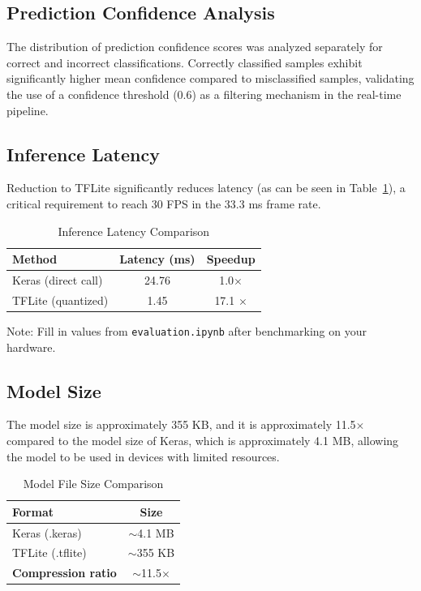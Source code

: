 \documentclass[conference]{IEEEtran}
\begin{document}
\subsection{Prediction Confidence Analysis}

The distribution of prediction confidence scores was analyzed separately for correct and incorrect classifications. Correctly classified samples exhibit significantly higher mean confidence compared to misclassified samples, validating the use of a confidence threshold (0.6) as a filtering mechanism in the real-time pipeline.

\subsection{Inference Latency}

Reduction to TFLite significantly reduces latency (as can be seen in Table~\ref{tab:latency}), a critical requirement to reach 30 FPS in the 33.3 ms frame rate.

\begin{table}[htbp]
\caption{Inference Latency Comparison}
\label{tab:latency}
\centering
\begin{tabular}{lcc}
\toprule
\textbf{Method} & \textbf{Latency (ms)} & \textbf{Speedup} \\
\midrule
Keras (direct call) & 24.76 & 1.0$\times$ \\
TFLite (quantized) & 1.45 & 17.1 $\times$ \\
\bottomrule
\end{tabular}
\begin{flushleft}
\footnotesize{Note: Fill in values from \texttt{evaluation.ipynb} after benchmarking on your hardware.}
\end{flushleft}
\end{table}

\subsection{Model Size}

The model size is approximately 355 KB, and it is approximately 11.5$\times$ compared to the model size of Keras, which is approximately 4.1 MB, allowing the model to be used in devices with limited resources.

\begin{table}[htbp]
\caption{Model File Size Comparison}
\label{tab:model_size}
\centering
\begin{tabular}{lc}
\toprule
\textbf{Format} & \textbf{Size} \\
\midrule
Keras (.keras) & $\sim$4.1 MB \\
TFLite (.tflite) & $\sim$355 KB \\
\midrule
\textbf{Compression ratio} & $\sim$11.5$\times$ \\
\bottomrule
\end{tabular}
\end{table}
\end{document}
